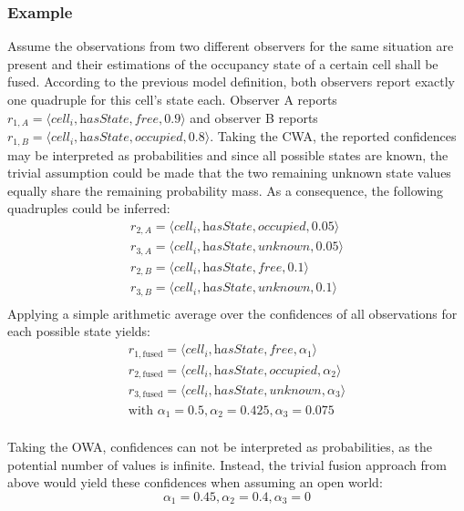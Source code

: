 \subsubsection{Example}
Assume the observations from two different observers for the same situation are present and their estimations of the occupancy state of a certain cell shall be fused. According to the previous model definition, both observers report exactly one quadruple for this cell's state each. Observer A reports $r_{1,A} = \langle \textit{cell}_i, \textit{hasState}, \textit{free}, 0.9 \rangle$ and observer B reports $r_{1,B} = \langle \textit{cell}_i, \textit{hasState}, \textit{occupied}, 0.8 \rangle$. Taking the CWA, the reported confidences may be interpreted as probabilities and since all possible states are known, the trivial assumption could be made that the two remaining unknown state values equally share the remaining probability mass. As a consequence, the following quadruples could be inferred:
\begin{gather*}
	r_{2,A} = \langle \textit{cell}_i, \textit{hasState}, \textit{occupied}, 0.05 \rangle \\
	r_{3,A} = \langle \textit{cell}_i, \textit{hasState}, \textit{unknown}, 0.05 \rangle \\
	r_{2,B} = \langle \textit{cell}_i, \textit{hasState}, \textit{free}, 0.1 \rangle \\
	r_{3,B} = \langle \textit{cell}_i, \textit{hasState}, \textit{unknown}, 0.1 \rangle \\
\end{gather*}
Applying a simple arithmetic average over the confidences of all observations for each possible state yields:
\begin{gather*}
	r_{1,\text{fused}} = \langle \textit{cell}_i, \textit{hasState}, \textit{free}, \alpha_1 \rangle \\
	r_{2,\text{fused}} = \langle \textit{cell}_i, \textit{hasState}, \textit{occupied}, \alpha_2 \rangle \\
	r_{3,\text{fused}} = \langle \textit{cell}_i, \textit{hasState}, \textit{unknown}, \alpha_3 \rangle \\
	\text{with\ } \alpha_1 = 0.5, \alpha_2 = 0.425, \alpha_3 = 0.075 \\
\end{gather*}

Taking the OWA, confidences can not be interpreted as probabilities, as the potential number of values is infinite. Instead, the trivial fusion approach from above would yield these confidences when assuming an open world:
$$\alpha_1 = 0.45, \alpha_2 = 0.4, \alpha_3 = 0$$

